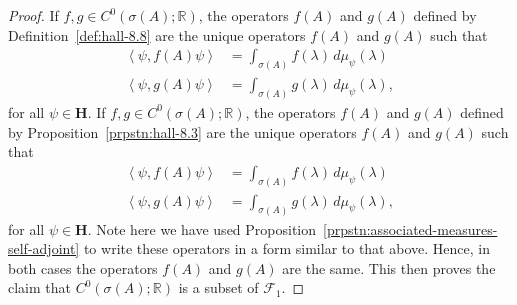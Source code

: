 \begin{proof}
If $f,g \in C^0(\sigma(A); \mathbb{R})$, the operators $f(A)$ and $g(A)$ defined by Definition~\ref{def:hall-8.8} are the unique operators $f(A)$ and $g(A)$ such that
\begin{align}
    \left< \psi, f(A)\psi \right> &= \int_{\sigma(A)} f(\lambda) \, d\mu_\psi(\lambda) \\
    \left< \psi, g(A)\psi \right> &= \int_{\sigma(A)} g(\lambda) \, d\mu_\psi(\lambda), 
\end{align}
for all $\psi \in \mathbf{H}$. If $f,g \in C^0(\sigma(A); \mathbb{R})$, the operators $f(A)$ and $g(A)$ defined by Proposition~\ref{prpstn:hall-8.3} are the unique operators $f(A)$ and $g(A)$ such that
\begin{align}
    \left< \psi, f(A)\psi \right> &= \int_{\sigma(A)} f(\lambda) \, d\mu_\psi(\lambda) \\
    \left< \psi, g(A)\psi \right> &= \int_{\sigma(A)} g(\lambda) \, d\mu_\psi(\lambda), 
\end{align}
for all $\psi \in \mathbf{H}$. Note here we have used Proposition~\ref{prpstn:associated-measures-self-adjoint} to write these operators in a form similar to that above. Hence, in both cases the operators $f(A)$ and $g(A)$ are the same. This then proves the claim that $C^0(\sigma(A); \mathbb{R})$ is a subset of $\mathcal{F}_1$.
\end{proof}

